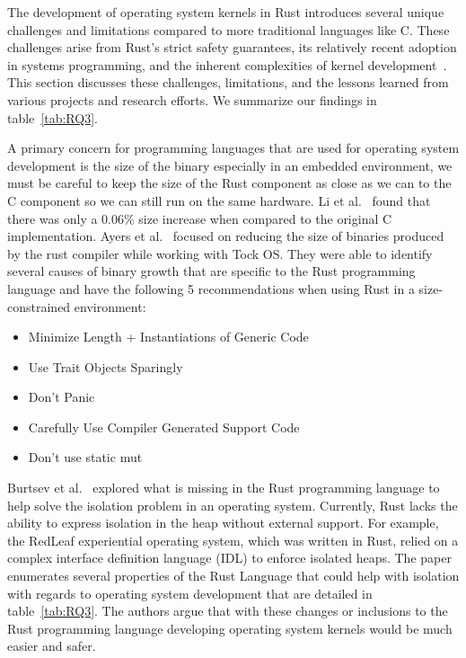 \documentclass[sigconf]{acmart}
\begin{document}
The development of operating system kernels in Rust introduces several unique challenges and
limitations compared to more traditional languages like C. These challenges arise from Rust’s strict
safety guarantees, its relatively recent adoption in systems programming, and the inherent
complexities of kernel development~\cite{Ojeda2021-ul}. This section discusses these challenges, limitations, and the
lessons learned from various projects and research efforts. We summarize our findings in
table~\ref{tab:RQ3}.

A primary concern for programming languages that are used for operating system development is the
size of the binary especially in an embedded environment, we must
be careful to keep the size of the Rust component as close as we can to the C component so we can
still run on the same hardware. Li et al.~\cite{Li2024-be} found that there was only a 0.06\% size increase when compared to the original C implementation.  Ayers et al.~\cite{Ayers2022-sf} focused
on reducing the size of binaries produced by the rust compiler while working with Tock OS. They were
able to identify several  causes of binary growth that are specific to the Rust programming language
and have the following 5 recommendations when using Rust in a size-constrained environment:
\begin{itemize}
  \item Minimize Length + Instantiations of Generic Code
  \item Use Trait Objects Sparingly
  \item Don't Panic
  \item Carefully Use Compiler Generated Support Code
  \item Don't use static mut
\end{itemize}

Burtsev et al.~\cite{Burtsev2021-mh} explored what is missing in the Rust programming language to
help solve the isolation problem in an operating system. Currently, Rust lacks the ability to express
isolation in the heap without external support. For example, the RedLeaf experiential operating
system, which was written in Rust, relied on a complex interface definition language (IDL) to enforce
isolated heaps. The paper enumerates several properties of the Rust Language that could help with
isolation with regards to operating system development that are detailed in table~\ref{tab:RQ3}. The
authors argue that with these changes or inclusions to the Rust programming language developing
operating system kernels would be much easier and safer.
\end{document}
